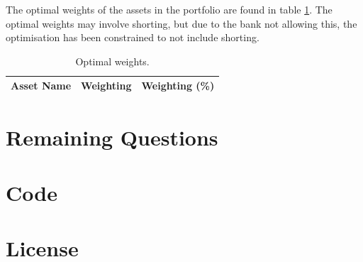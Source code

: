 \documentclass[a4paper]{article}
\begin{document}
The optimal weights of the assets in the portfolio are found in table \ref{table_optimal_weights}. The optimal weights may involve shorting, but due to the bank not allowing this, the optimisation has been constrained to not include shorting.

\begin{table}[H]
    \begin{center}
    \begin{tabular}{ |l|l|l| }
        \hline
        Asset Name & Weighting & Weighting (\%) \\
        \hline

        

        \hline
    \end{tabular}
    \caption{Optimal weights.}
    \label{table_optimal_weights}
    \end{center}
\end{table}



\section{Remaining Questions}

\appendix

\section{Code}



\section{License}

\doclicenseThis
\end{document}
